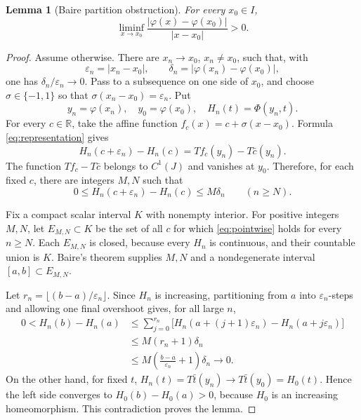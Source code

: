 \documentclass[11pt]{article}
\newtheorem{lemma}[theorem]{Lemma}
\newcommand{\R}{\mathbb R}
\begin{document}
\begin{lemma}[Baire partition obstruction]\label{lem:baire}
For every \(x_0\in I\),
\[
 \liminf_{x\to x_0}
 \frac{|\varphi(x)-\varphi(x_0)|}{|x-x_0|}>0.
\]
\end{lemma}

\begin{proof}
Assume otherwise.  There are \(x_n\to x_0\), \(x_n\ne x_0\), such that,
with
\[
 \varepsilon_n=|x_n-x_0|,
 \qquad
 \delta_n=|\varphi(x_n)-\varphi(x_0)|,
\]
one has \(\delta_n/\varepsilon_n\to0\).  Pass to a subsequence on one side
of \(x_0\), and choose \(\sigma\in\{-1,1\}\) so that
\(\sigma(x_n-x_0)=\varepsilon_n\).  Put
\[
 y_n=\varphi(x_n),\quad y_0=\varphi(x_0),\quad
 H_n(t)=\Phi(y_n,t).
\]
For every \(c\in\R\), take the affine function
\(f_c(x)=c+\sigma(x-x_0)\).  Formula \eqref{eq:representation} gives
\begin{equation}\label{eq:increment}
 H_n(c+\varepsilon_n)-H_n(c)
 =Tf_c(y_n)-T\bar c(y_n).
\end{equation}
The function \(Tf_c-T\bar c\) belongs to \(C^1(J)\) and vanishes at
\(y_0\).  Therefore, for each fixed \(c\), there are integers \(M,N\) such
that
\begin{equation}\label{eq:pointwise}
 0\le H_n(c+\varepsilon_n)-H_n(c)\le M\delta_n
 \qquad(n\ge N).
\end{equation}

Fix a compact scalar interval \(K\) with nonempty interior.  For positive
integers \(M,N\), let \(E_{M,N}\subset K\) be the set of all \(c\) for which
\eqref{eq:pointwise} holds for every \(n\ge N\).  Each \(E_{M,N}\) is closed,
because every \(H_n\) is continuous, and their countable union is \(K\).
Baire's theorem supplies \(M,N\) and a nondegenerate interval
\([a,b]\subset E_{M,N}\).

Let \(r_n=\lfloor(b-a)/\varepsilon_n\rfloor\).  Since \(H_n\) is increasing,
partitioning from \(a\) into \(\varepsilon_n\)-steps and allowing one final
overshoot gives, for all large \(n\),
\begin{align*}
 0<H_n(b)-H_n(a)
 &\le \sum_{j=0}^{r_n}
 \bigl[H_n(a+(j+1)\varepsilon_n)-H_n(a+j\varepsilon_n)\bigr]\\
 &\le M(r_n+1)\delta_n\\
 &\le M\left(\frac{b-a}{\varepsilon_n}+1\right)\delta_n
 \longrightarrow0.
\end{align*}
On the other hand, for fixed \(t\),
\(H_n(t)=T\bar t(y_n)\to T\bar t(y_0)=H_0(t)\).  Hence the left side
converges to \(H_0(b)-H_0(a)>0\), because \(H_0\) is an increasing
homeomorphism.  This contradiction proves the lemma.
\end{proof}
\end{document}
